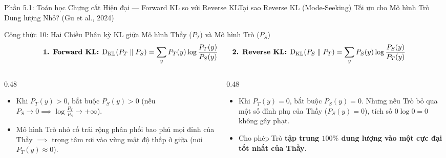 \begin{frame}{Phần 5.1: Toán học Chưng cất Hiện đại --- Forward KL so với Reverse KL}{Tại sao Reverse KL (Mode-Seeking) Tối ưu cho Mô hình Trò Dung lượng Nhỏ? (Gu et al., 2024)}
  \begin{block}{Công thức 10: Hai Chiều Phân kỳ KL giữa Mô hình Thầy ($P_T$) và Mô hình Trò ($P_S$)}
    \[
      \text{\textbf{1. Forward KL:}} \; \operatorname{D_{\mathrm{KL}}}(P_T \parallel P_S) = \sum_{y} P_T(y) \log \frac{P_T(y)}{P_S(y)}
      \qquad
      \text{\textbf{2. Reverse KL:}} \; \operatorname{D_{\mathrm{KL}}}(P_S \parallel P_T) = \sum_{y} P_S(y) \log \frac{P_S(y)}{P_T(y)}
    \]
  \end{block}

  \begin{columns}[T,onlytextwidth]
    \begin{column}{0.48\textwidth}
      \footnotesize
      \begin{itemize}\setlength{\itemsep}{4pt}
        \item Khi $P_T(y) > 0$, bắt buộc $P_S(y) > 0$ (nếu $P_S \to 0 \implies \log\frac{P_T}{P_S} \to +\infty$).
        \item Mô hình Trò nhỏ cố trải rộng phân phối bao phủ mọi đỉnh của Thầy $\implies$ trọng tâm rơi vào vùng mật độ thấp ở giữa (nơi $P_T(y) \approx 0$).
      \end{itemize}
    \end{column}
    \begin{column}{0.48\textwidth}
      \footnotesize
      \begin{itemize}\setlength{\itemsep}{4pt}
        \item Khi $P_T(y) = 0$, bắt buộc $P_S(y) = 0$. Nhưng nếu Trò bỏ qua một số đỉnh phụ của Thầy ($P_S(y) = 0$), tích số $0 \log 0 = 0$ không gây phạt.
        \item Cho phép Trò \textbf{tập trung $100\%$ dung lượng vào một cực đại tốt nhất của Thầy}.
      \end{itemize}
    \end{column}
  \end{columns}
\end{frame}

